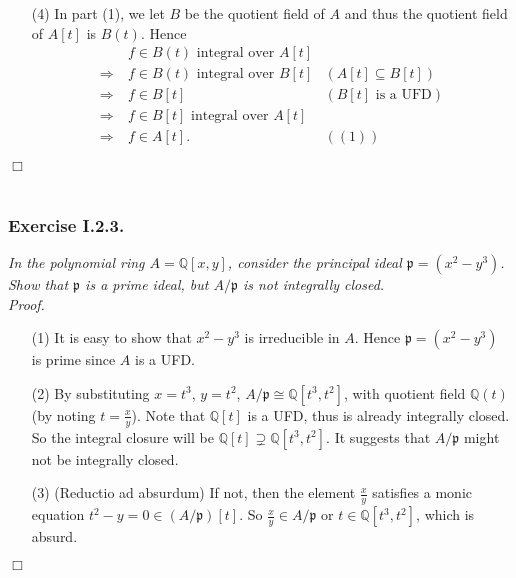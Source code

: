 \documentclass{article}
\begin{document}
\begin{enumerate}
\item[(4)]
  In part (1), we let $B$ be the quotient field of $A$
  and thus the quotient field of $A[t]$ is $B(t)$.
  Hence
  \begin{align*}
    &\:
    \text{$f \in B(t)$ integral over $A[t]$} \\
    \Longrightarrow &\:
    \text{$f \in B(t)$ integral over $B[t]$}
      &(A[t] \subseteq B[t]) \\
    \Longrightarrow &\:
    f \in B[t]
      &(\text{$B[t]$ is a UFD}) \\
    \Longrightarrow &\:
    \text{$f \in B[t]$ integral over $A[t]$} \\
    \Longrightarrow &\:
    f \in A[t].
      &((1))
  \end{align*}
\end{enumerate}
$\Box$ \\\\






\subsubsection*{Exercise I.2.3.}
\emph{In the polynomial ring $A = \mathbb{Q}[x,y]$,
consider the principal ideal $\mathfrak{p} = (x^2-y^3)$.
Show that $\mathfrak{p}$ is a prime ideal,
but $A/\mathfrak{p}$ is not integrally closed.} \\



\emph{Proof.}
\begin{enumerate}
\item[(1)]
  It is easy to show that $x^2-y^3$ is irreducible in $A$.
  Hence $\mathfrak{p} = (x^2-y^3)$ is prime since $A$ is a UFD.

\item[(2)]
  By substituting $x = t^3$, $y = t^2$,
  $A/\mathfrak{p} \cong \mathbb{Q}[t^3,t^2]$,
  with quotient field $\mathbb{Q}(t)$ (by noting $t = \frac{x}{y}$).
  Note that $\mathbb{Q}[t]$ is a UFD, thus is already integrally closed.
  So the integral closure will be $\mathbb{Q}[t] \supsetneq \mathbb{Q}[t^3,t^2]$.
  It suggests that $A/\mathfrak{p}$ might not be integrally closed.

\item[(3)]
  (Reductio ad absurdum)
  If not, then the element $\frac{x}{y}$ satisfies a monic equation
  $t^2 - y = 0 \in (A/\mathfrak{p})[t]$.
  So $\frac{x}{y} \in A/\mathfrak{p}$ or $t \in \mathbb{Q}[t^3,t^2]$, which is absurd.
\end{enumerate}
$\Box$ \\
\end{document}
